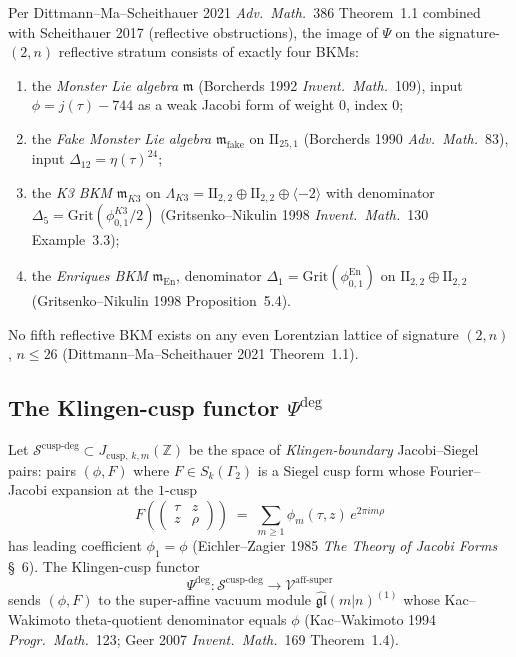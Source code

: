 \begin{example}
\label{ex:psi-four-images}
Per Dittmann--Ma--Scheithauer 2021 \textit{Adv.~Math.}~386
Theorem~1.1 combined with Scheithauer 2017 (reflective
obstructions), the image of $\Psi$ on the signature-$(2, n)$
reflective stratum consists of exactly four BKMs:
\begin{enumerate}
\item the \emph{Monster Lie algebra} $\mathfrak m$
(Borcherds 1992 \textit{Invent.~Math.}~109), input
$\phi = j(\tau) - 744$ as a weak Jacobi form of weight $0$,
index $0$;
\item the \emph{Fake Monster Lie algebra} $\mathfrak m_{\mathrm{fake}}$
on $\mathrm{II}_{25,1}$
(Borcherds 1990 \textit{Adv.~Math.}~83), input
$\Delta_{12} = \eta(\tau)^{24}$;
\item the \emph{K3 BKM} $\mathfrak m_{K3}$ on
$\Lambda_{K3} = \mathrm{II}_{2,2}\oplus \mathrm{II}_{2,2}\oplus
\langle -2\rangle$ with denominator
$\Delta_5 = \mathrm{Grit}(\phi_{0,1}^{K3}/2)$
(Gritsenko--Nikulin 1998 \textit{Invent.~Math.}~130 Example~3.3);
\item the \emph{Enriques BKM} $\mathfrak m_{\mathrm{En}}$,
denominator $\Delta_1 = \mathrm{Grit}(\phi_{0,1}^{\mathrm{En}})$
on $\mathrm{II}_{2,2} \oplus \mathrm{II}_{2,2}$
(Gritsenko--Nikulin 1998 Proposition~5.4).
\end{enumerate}
No fifth reflective BKM exists on any even Lorentzian lattice
of signature $(2, n)$, $n \le 26$ (Dittmann--Ma--Scheithauer
2021 Theorem~1.1).
\end{example}

\subsection{The Klingen-cusp functor \texorpdfstring{$\Psi^{\deg}$}{Psi-deg}}
\label{subsec:psi-deg}

\begin{definition}
\label{def:psi-deg}
Let
$\mathcal S^{\mathrm{cusp\text{-}deg}}
\subset J_{\mathrm{cusp},\,k,m}(\mathbb Z)$
be the space of \emph{Klingen-boundary} Jacobi--Siegel pairs:
pairs $(\phi, F)$ where $F \in S_k(\Gamma_2)$ is a Siegel cusp
form whose Fourier--Jacobi expansion at the $1$-cusp
\[
F\!\left(\begin{pmatrix} \tau & z \\ z & \rho \end{pmatrix}\right)
\;=\; \sum_{m \ge 1} \phi_m(\tau, z)\, e^{2\pi i m \rho}
\]
has leading coefficient $\phi_1 = \phi$
(Eichler--Zagier 1985 \textit{The Theory of Jacobi Forms} \S~6).
The Klingen-cusp functor
\[
\Psi^{\deg} : \mathcal S^{\mathrm{cusp\text{-}deg}}
\longrightarrow \mathcal V^{\mathrm{aff\text{-}super}}
\]
sends $(\phi, F)$ to the super-affine vacuum module
$\widehat{\mathfrak{gl}}(m|n)^{(1)}$ whose Kac--Wakimoto
theta-quotient denominator equals $\phi$
(Kac--Wakimoto 1994 \textit{Progr.~Math.}~123; Geer 2007
\textit{Invent.~Math.}~169 Theorem~1.4).
\end{definition}


